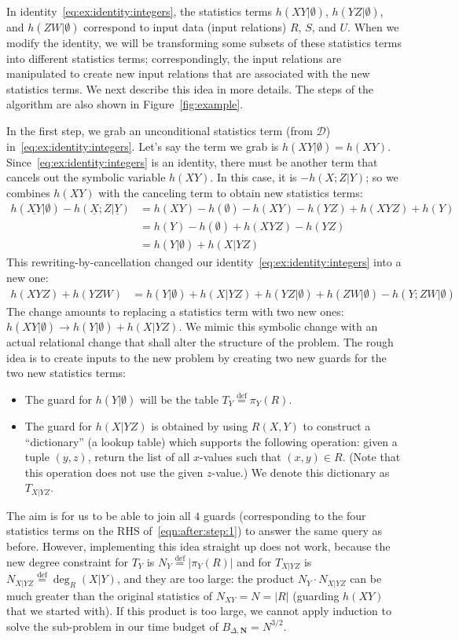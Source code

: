 \documentclass[10pt,a4paper]{article}
\newcommand{\calD}{\mathcal D}
\newcommand{\defeq}{\stackrel{\text{def}}{=}}
\begin{document}
In identity~\eqref{eq:ex:identity:integers}, the statistics terms
$h(XY|\emptyset)$, $h(YZ|\emptyset)$, and $h(ZW|\emptyset)$ correspond to input data
(input relations) $R$, $S$, and $U$.
When we modify the identity, we will be transforming some subsets of these statistics
terms into different statistics terms; correspondingly, the input relations are
manipulated to create new input relations that are associated with the new statistics
terms.
We next describe this idea in more details.
The steps of the algorithm are also shown in Figure~\ref{fig:example}.

In the first step, we grab an unconditional statistics term (from $\calD$)
in~\eqref{eq:ex:identity:integers}. Let's say the term we grab is $h(XY |\emptyset)=h(XY)$.
Since~\eqref{eq:ex:identity:integers} is an identity, there must be another term that
cancels out the symbolic variable $h(XY)$. In this case, it is $-h(X;Z|Y)$; so we combines
$h(XY)$ with the canceling term to obtain new statistics terms:
%
\begin{align*}
  h(\underline{XY}|\emptyset) - h(\underline{X};Z|\underline{Y}) &=
  h(XY)-h(\emptyset)-h(XY)-h(YZ)+h(XYZ)+h(Y)\\
  &=h(Y) - h(\emptyset)+ h(XYZ)-h(YZ)\\
  &=h(Y|\emptyset)+h(X|YZ)
\end{align*}
%
This rewriting-by-cancellation changed our identity~\eqref{eq:ex:identity:integers} into a new one:
%
\begin{align} \label{eqn:after:step:1}
  h(XYZ)+h(YZW) &= h(Y|\emptyset)+h(X|YZ)+h(YZ|\emptyset)+h(ZW|\emptyset) - h(Y;ZW|\emptyset)
\end{align}
%
The change amounts to replacing a statistics term with two new ones:
$h(XY|\emptyset) \to h(Y|\emptyset)+h(X|YZ)$.
We mimic this symbolic change with an actual relational change that shall alter the
structure of the problem.
The rough idea is to create inputs to the new problem by creating two new guards for the two new
statistics terms:
\begin{itemize}
\item The guard for $h(Y|\emptyset)$ will be the table $T_Y \defeq \pi_Y(R)$.
\item The guard for $h(X|YZ)$ is obtained by using $R(X,Y)$ to construct a ``dictionary''
(a lookup table) which supports the following operation: given
a tuple $(y, z)$, return the list of all $x$-values such that $(x, y) \in R$.
(Note that this operation does not use the given $z$-value.)
We denote this dictionary as $T_{X|YZ}$.
\end{itemize}
The aim is for us to be able to join all $4$ guards (corresponding to the four statistics
terms on the RHS of~\eqref{eqn:after:step:1}) to answer the same query as before.
However, implementing this idea straight up does not work, because the new degree constraint
for $T_Y$ is $N_Y \defeq |\pi_Y(R)|$ and for $T_{X|YZ}$ is $N_{X|YZ} \defeq\deg_R(X|Y)$, and they are too
large: the product $N_Y \cdot N_{X|YZ}$ can be much greater than the original statistics
of $N_{XY} = N = |R|$ (guarding $h(XY)$ that we started with).
If this product is too large, we cannot apply induction to solve the sub-problem in our time budget of $B_{\Delta, \bm N} = N^{3/2}$.
\end{document}
